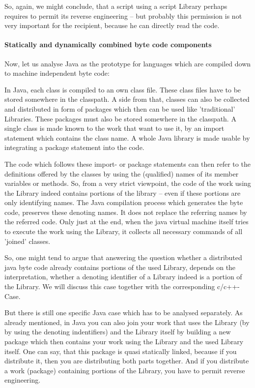 So, again, we might conclude, that a script using a script Library perhaps
requires to permit its reverse engineering -- but probably this permission is
not very important for the recipient, because he can directly read the code.

\paragraph{Statically and dynamically combined byte code components}

Now, let us analyse Java as the prototype for languages which are compiled down
to machine independent byte code:

In Java, each class is compiled to an own class file. These class files have to
be stored somewhere in the classpath. A side from that, classes can also be
collected and distributed in form of packages which then can be used like
'traditional' Libraries. These packages must also be stored somewhere in the
classpath. A single class is made known to the work that want to use it, by an
import statement which contains the class name. A whole Java library is made
usable by integrating a package statement into the code. 

The code which follows these import- or package statements can then refer to the
definitions offered by the classes by using the (qualified) names of its member
variables or methods. So, from a very strict viewpoint, the code of the work
using the Library indeed contains portions of the library -- even if these
portions are only identifying names. The Java compilation process which
generates the byte code, preserves these denoting names. It does not replace the
referring names by the referred code. Only just at the end, when the java
virtual machine itself tries to execute the work using the Library, it collects
all necessary commands of all 'joined' classes.

So, one might tend to argue that answering the question whether a distributed
java byte code already contains portions of the used Library, depends on the
interpretation, whether a denoting identifier of a Library indeed is a portion
of the Library. We will discuss this case together with the corresponding
c/c++-Case. 

But there is still one specific Java case which has to be analysed separately.
As already mentioned, in Java you can also join your work that uses the Library
(by by using the denoting indentifiers) and the Library itself by building a new
package which then contains your work using the Library and the used Library
itself. One can say, that this package is quasi statically linked, because if
you distribute it, then you are distributing both parts together. And if you
distribute a work (package) containing portions of the Library, you have to
permit reverse engineering.

